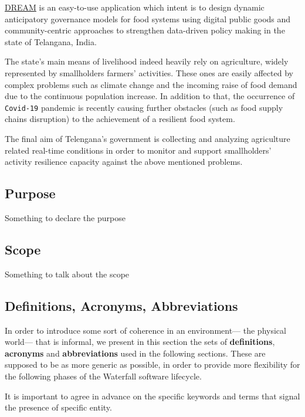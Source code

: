 \hyperref[tab:acronymsTable]{DREAM} is an easy-to-use application which intent is \cite{grw_GitHub} to design dynamic anticipatory governance models for food systems using digital public goods and community-centric approaches to strengthen data-driven policy making in the state of Telangana, India.

The state's main means of livelihood indeed heavily rely on agriculture, widely represented by smallholders farmers' activities. These ones are easily affected by complex problems such as climate change and the incoming raise of food demand due to the continuous population increase. In addition to that, the occurrence of \texttt{Covid-19} pandemic is recently causing further obstacles (such as food supply chains disruption) to the achievement of a resilient food system.

The final aim of Telengana's government is collecting and analyzing agriculture related real-time conditions in order to monitor and support smallholders' activity resilience capacity against the above mentioned problems.

\subsection{Purpose}
\label{sec:purpose}
Something to declare the purpose



\subsection{Scope}
\label{sec:scope}
Something to talk about the scope


\subsection{Definitions, Acronyms, Abbreviations}
\label{sec:def_acr_abr}
In order to introduce some sort of coherence in an environment--- the physical world--- that is informal, we present in this section the sets of \textbf{definitions}, \textbf{acronyms} and \textbf{abbreviations} used in the following sections. These are supposed to be as more generic as possible, in order to provide more flexibility for the following phases of the Waterfall software lifecycle.

It is important to agree in advance on the specific keywords and terms that signal the presence of specific entity. 

